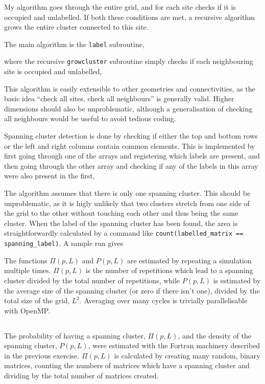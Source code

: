 \documentclass[11pt,british,a4paper]{report}
\begin{document}
My algorithm goes through the entire grid, and for each site checks if it is occupied and unlabelled. If both these conditions are met, a recursive algorithm grows the entire cluster connected to this site.

The main algorithm is the \lstinline{label} subroutine,

where the recursive \lstinline{growcluster} subroutine simply checks if each neighbouring site is occupied and unlabelled,

This algorithm is easily extensible to other geometries and connectivities, as the basic idea ``check all sites, check all neighbours'' is generally valid. Higher dimensions should also be unproblematic, although a generalisation of checking all neighbours would be useful to avoid tedious coding.

Spanning cluster detection is done by checking if either the top and bottom rows or the left and right columns contain common elements. This is implemented by first going through one of the arrays and registering which labels are present, and then going through the other array and checking if any of the labels in this array were also present in the first,

The algorithm assumes that there is only one spanning cluster. This should be unproblematic, as it is higly unlikely that two clusters stretch from one side of the grid to the other without touching each other and thus being the same cluster. When the label of the spanning cluster has been found, the area is straightforwardly calculated by a command like \lstinline{count(labelled_matrix == spanning_label)}.
A sample run gives


The functions \(\Pi(p,L)\) and \(P(p,L)\) are estimated by repeating a simulation multiple times. \(\Pi(p,L)\) is the number of repetitions which lead to a spanning cluster divided by the total number of repetitions, while \(P(p,L)\) is estimated by the average size of the spanning cluster (or zero if there isn't one), divided by the total size of the grid, \(L^2\). Averaging over many cycles is trivially parallelisable with OpenMP.

%
\subsection{}
The probability of having a spanning cluster, \(\Pi(p,L)\), and the density of the spanning cluster, \(P(p,L)\), were estimated with the Fortran machinery described in the previous exercise. \(\Pi(p,L)\) is calculated by creating many random, binary matrices, counting the numbers of matrices which have a spanning cluster and dividing by the total number of matrices created.
\end{document}
